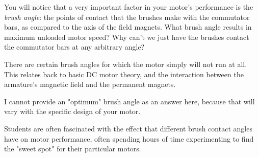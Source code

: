 

You will notice that a very important factor in your motor's performance is the {\it brush angle}: the points of contact that the brushes make with the commutator bars, as compared to the axis of the field magnets.  What brush angle results in maximum unloaded motor speed?  Why can't we just have the brushes contact the commutator bars at any arbitrary angle?







There are certain brush angles for which the motor simply will not run at all.  This relates back to basic DC motor theory, and the interaction between the armature's magnetic field and the permanent magnets.

I cannot provide an "optimum" brush angle as an answer here, because that will vary with the specific design of your motor.







Students are often fascinated with the effect that different brush contact angles have on motor performance, often spending hours of time experimenting to find the "sweet spot" for their particular motors.



